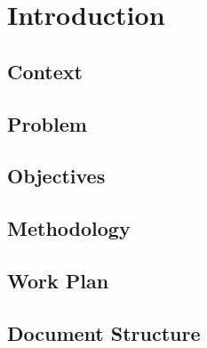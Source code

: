 % 
\chapter{Introduction} %
\label{chap:Chapter1} %


%
\section{Context} 


\section{Problem}



\section{Objectives}

\section{Methodology}

\section{Work Plan}

\section{Document Structure}

